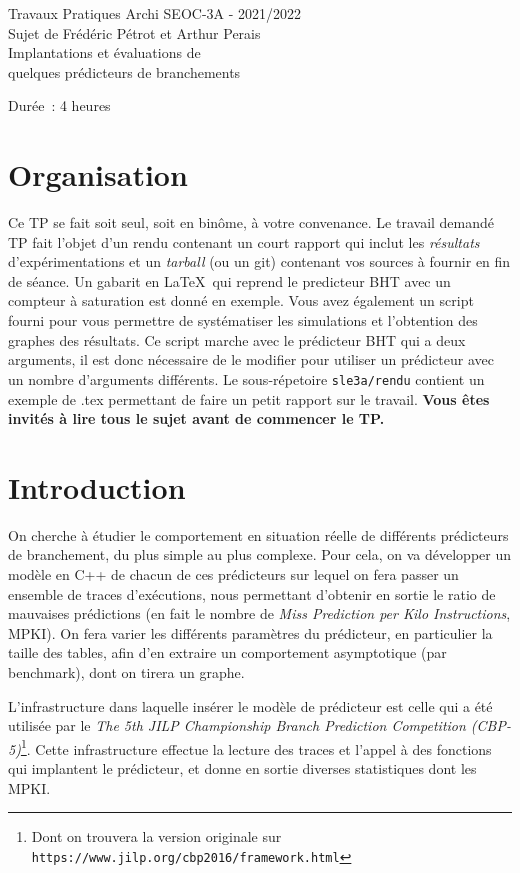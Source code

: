 \documentclass[a4paper]{article}
\begin{document}
\begin{center}
\large
Travaux Pratiques Archi SEOC-3A - 2021/2022\\
Sujet de Frédéric Pétrot et Arthur Perais\\
\LARGE
Implantations et évaluations de\\
quelques prédicteurs de branchements\\
\large

Durée~: 4 heures
\end{center}
\section{Organisation}
Ce TP se fait soit seul, soit en binôme, à votre convenance.
Le travail demandé TP fait l'objet d'un rendu contenant un court rapport qui inclut les \emph{résultats} d'expérimentations et un \emph{tarball} (ou un git) contenant vos sources à fournir en fin de séance.
Un gabarit en \LaTeX\ qui reprend le predicteur BHT avec un compteur à saturation est donné en exemple.
Vous avez également un script fourni pour vous permettre de systématiser les simulations et l'obtention des graphes des résultats.
Ce script marche avec le prédicteur BHT qui a deux arguments, il est donc nécessaire de le modifier pour utiliser un prédicteur avec un nombre d'arguments différents.
Le sous-répetoire \verb+sle3a/rendu+ contient un exemple de .tex permettant de faire un petit rapport sur le travail. \textbf{Vous êtes invités à lire tous le sujet avant de commencer le TP.}

\section{Introduction}
On cherche à étudier le comportement en situation réelle de différents prédicteurs de branchement, du plus simple au plus complexe. Pour cela, on va développer un modèle en C++ de chacun de ces prédicteurs sur lequel on fera passer un ensemble de traces d'exécutions, nous permettant d'obtenir en sortie le ratio de mauvaises prédictions (en fait le nombre de \emph{Miss Prediction per Kilo Instructions}, MPKI). On fera varier les différents paramètres du prédicteur, en particulier la taille des tables, afin d'en extraire un comportement asymptotique (par benchmark), dont on tirera un graphe.

L'infrastructure dans laquelle insérer le modèle de prédicteur est celle qui a été utilisée par le \emph{The 5th JILP Championship Branch Prediction Competition (CBP-5)}\footnote{Dont on trouvera la version originale sur \texttt{https://www.jilp.org/cbp2016/framework.html}}.
Cette infrastructure effectue la lecture des traces et l'appel à des fonctions qui implantent le prédicteur, et donne en sortie diverses statistiques dont les MPKI.
\end{document}
